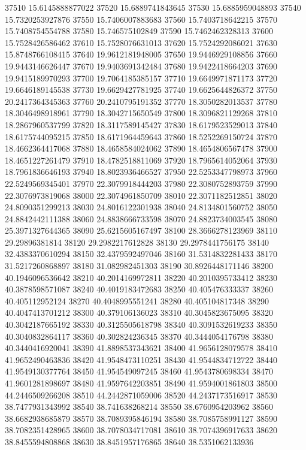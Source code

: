 {37510 15.6145888877022
37520 15.6889741843645
37530 15.6885959048893
37540 15.7320253927876
37550 15.7406007883683
37560 15.7403718642215
37570 15.7408754554788
37580 15.746575102849
37590 15.7462462328313
37600 15.7528426586462
37610 15.7528076631013
37620 15.7524292086021
37630 15.8748766108415
37640 19.9612181948005
37650 19.9446929108856
37660 19.9443146626447
37670 19.9403691342484
37680 19.9422418664203
37690 19.9415189970293
37700 19.7064185385157
37710 19.6649971871173
37720 19.6646189145538
37730 19.6629427781925
37740 19.6625644826372
37750 20.2417364345363
37760 20.2410795191352
37770 18.3050282013537
37780 18.3046498918961
37790 18.3042715650549
37800 18.3096821129268
37810 18.2867960537799
37820 18.3117589145427
37830 18.6179523529013
37840 18.6175744095215
37850 18.6171964459643
37860 18.5252269150724
37870 18.4662364417068
37880 18.4658584024062
37890 18.4654806567478
37900 18.4651227261479
37910 18.4782518811069
37920 18.7965614052064
37930 18.7961836646193
37940 18.8023936466527
37950 22.5253347798973
37960 22.5249569345401
37970 22.3079918444203
37980 22.3080752893759
37990 22.3076973819068
38000 22.3074961850709
38010 22.3071182512851
38020 24.8090351299213
38030 24.8016122301938
38040 24.8134801560752
38050 24.8842442111388
38060 24.8838666733598
38070 24.8823734003545
38080 25.3971327644365
38090 25.6215605167497
38100 28.3666278123969
38110 29.29896381814
38120 29.2982217612828
38130 29.2978441756175
38140 32.4383370610294
38150 32.4379592497046
38160 31.5314832281433
38170 31.5217260868897
38180 31.082982451303
38190 30.8926448171146
38200 40.1946096536642
38210 40.2014169972811
38220 40.2010395733412
38230 40.3878598571087
38240 40.4019183472683
38250 40.405476333337
38260 40.405112952124
38270 40.4048995551241
38280 40.405104817348
38290 40.4047413701212
38300 40.379106136023
38310 40.3045823675095
38320 40.3042187665192
38330 40.3125505618798
38340 40.3091532619233
38350 40.3040832864117
38360 40.302824236345
38370 40.3444054176798
38380 40.3440416920041
38390 41.8898537343621
38400 41.9656128079578
38410 41.9652490463836
38420 41.9548473110251
38430 41.9544834712722
38440 41.9549130377764
38450 41.954549097245
38460 41.9543780698334
38470 41.9601281898697
38480 41.9597642203851
38490 41.9594001861803
38500 44.2446509266208
38510 44.2442871059006
38520 44.2437173516917
38530 38.7477931343992
38540 38.741638268214
38550 38.6760954203962
38560 38.6682938685879
38570 38.7089395846194
38580 38.7085758991127
38590 38.7082351428965
38600 38.7078034717081
38610 38.7074396917633
38620 38.8455594808868
38630 38.8451957176865
38640 38.5351062133936
}
